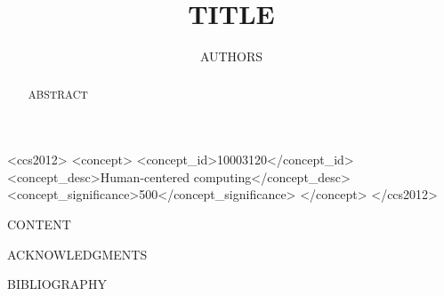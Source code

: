 \documentclass[sigconf,review,anonymous]{acmart}
\begin{document}
\title{{{TITLE}}}

\author{{{AUTHORS}}}

\begin{abstract}
{{ABSTRACT}}
\end{abstract}

\begin{CCSXML}
<ccs2012>
<concept>
<concept_id>10003120</concept_id>
<concept_desc>Human-centered computing</concept_desc>
<concept_significance>500</concept_significance>
</concept>
</ccs2012>
\end{CCSXML}


\maketitle

{{CONTENT}}

{{ACKNOWLEDGMENTS}}

{{BIBLIOGRAPHY}}
\end{document}
